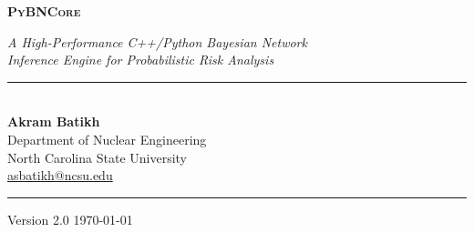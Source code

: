 \documentclass[11pt, letterpaper]{article}
\newcommand{\bncore}{\textsc{PyBNCore}}
\newcommand{\smiletool}{\textsc{SMILE}}
\theoremstyle{definitionstyle}
\begin{document}
\begin{titlepage}
  \centering
  \vspace*{1.5cm}
  {\huge\bfseries \bncore{}\par}
  \vspace{0.5cm}
  {\large\itshape A High-Performance C++/Python Bayesian Network\\
  Inference Engine for Probabilistic Risk Analysis\par}
  \vspace{2cm}
  \rule{\linewidth}{0.5pt}\\[0.5em]
  {\normalsize
    \textbf{Akram Batikh}\\
    Department of Nuclear Engineering\\
    North Carolina State University\\
    \href{mailto:asbatikh@ncsu.edu}{asbatikh@ncsu.edu}
  }\\[0.5em]
  \rule{\linewidth}{0.5pt}
  \vspace{1cm}

  \begin{abstract}
    \noindent
    \bncore{} is an open-source, high-performance Bayesian Network (BN)
    inference engine designed for large-scale Monte Carlo and epistemic
    uncertainty analyses in Probabilistic Risk Assessment (PRA). The
    library provides a C++20 backend with zero-allocation inference
    kernels, SIMD-accelerated factor arithmetic, and multi-threaded
    batched execution via a persistent thread pool, exposed through idiomatic
    Python bindings via \texttt{nanobind}. Unlike commercial tools such as
    \smiletool{}/GeNIe, which execute one scenario at a time, \bncore{}
    ingests an entire \emph{batch} of evidence scenarios as a NumPy matrix
    and solves them simultaneously, achieving speedups of up to
    $6.82\times$ over \smiletool{} in batched mode and $2.70\times$ in
    sequential single-query mode with d-separation pruning. The engine
    implements exact
    Shafer--Shenoy belief propagation on Junction Trees with barren node
    pruning, compiled via moralization, triangulation (four selectable
    heuristics), and Kruskal's maximum spanning tree algorithm.
    Additional capabilities include soft/virtual evidence, MAP/MPE
    inference with traceback, parameter sensitivity analysis, Value of
    Information ranking, Noisy-MAX/OR gates, equation nodes, and
    approximate inference via Loopy Belief Propagation. Comprehensive
    benchmarks against \smiletool{} demonstrate that \bncore{} outperforms
    it in 8 out of 10 tested configurations, with peak speedups of
    $6.82\times$ in batched inference.
  \end{abstract}

  \vfill
  {\small Version 2.0 \quad \today}
\end{titlepage}
\end{document}
